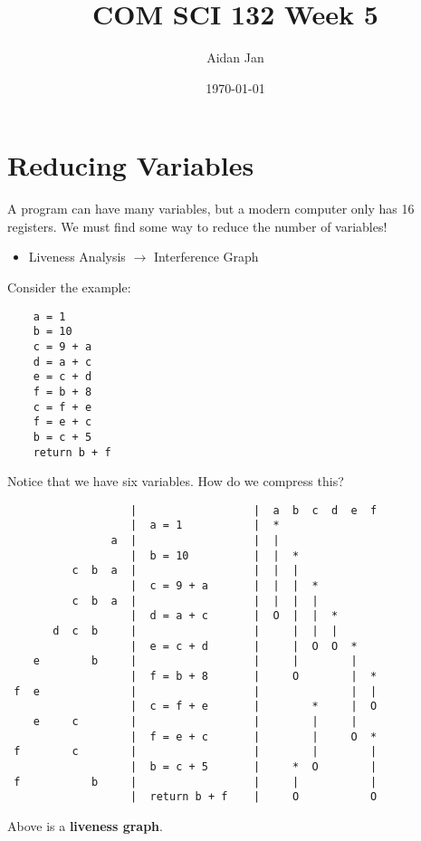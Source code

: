 \documentclass[10pt]{article}
\title{COM SCI 132 Week 5}
\author{Aidan Jan}
\date{\today}
\begin{document}
\maketitle
\section*{Reducing Variables}
A program can have many variables, but a modern computer only has 16 registers.  We must find some way to reduce the number of variables!\\
\begin{itemize}
    \item Liveness Analysis $\rightarrow$ Interference Graph
\end{itemize}
Consider the example:
\begin{verbatim}
    a = 1
    b = 10
    c = 9 + a
    d = a + c
    e = c + d
    f = b + 8
    c = f + e
    f = e + c
    b = c + 5
    return b + f
\end{verbatim}
Notice that we have six variables.  How do we compress this?
\begin{verbatim}
                   |                  |  a  b  c  d  e  f
                   |  a = 1           |  *
                a  |                  |  | 
                   |  b = 10          |  |  *
          c  b  a  |                  |  |  |
                   |  c = 9 + a       |  |  |  *
          c  b  a  |                  |  |  |  |
                   |  d = a + c       |  O  |  |  *
       d  c  b     |                  |     |  |  |
                   |  e = c + d       |     |  O  O  *
    e        b     |                  |     |        |
                   |  f = b + 8       |     O        |  *
 f  e              |                  |              |  |
                   |  c = f + e       |        *     |  O
    e     c        |                  |        |     |
                   |  f = e + c       |        |     O  *
 f        c        |                  |        |        |
                   |  b = c + 5       |     *  O        |
 f           b     |                  |     |           |
                   |  return b + f    |     O           O
\end{verbatim}
Above is a \textbf{liveness graph}.
\end{document}
